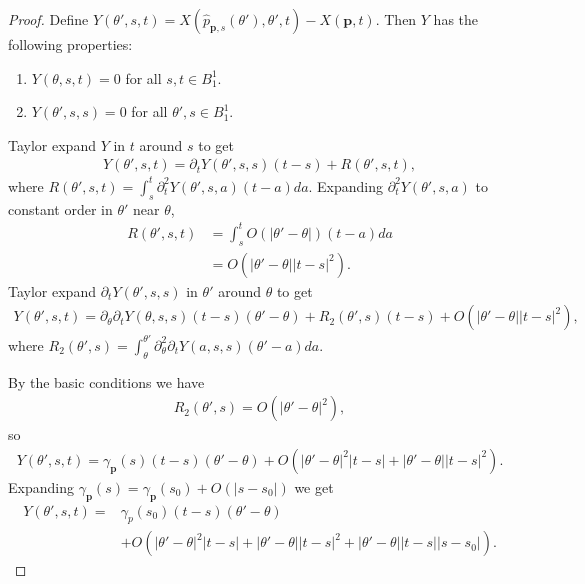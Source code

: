\documentclass[12pt]{amsart}
\numberwithin{equation}{section}
\newcommand{\1}{\mathbbm{1}}
\newcommand{\p}{\mathbf p}
\begin{document}
\begin{proof}
    Define $Y(\theta', s, t) = X(\hat p_{\p,s}(\theta'), \theta', t) - X(\p,t)$. Then $Y$ has the following properties:
    \begin{enumerate}
        \item $Y(\theta, s, t) = 0$ for all $s,t \in B_1^1$. 
        \item $Y(\theta', s, s) = 0$ for all $\theta', s \in B_1^1$. 
    \end{enumerate}
    Taylor expand $Y$ in $t$ around $s$ to get 
    \begin{align}
        Y(\theta', s, t) = \partial_t Y(\theta', s, s)(t - s) + R(\theta', s, t),
    \end{align}
    where $R(\theta', s, t) = \int_{s}^t \partial_t^2 Y(\theta', s, a) (t-a)da$. Expanding $\partial_t^2 Y(\theta',s, a)$ to constant order in $\theta'$ near $\theta$, 
    \begin{align}
        R(\theta', s, t) &=  \int_s^t O(|\theta'-\theta|) (t - a) da\\
        &= O(|\theta' - \theta| |t - s|^2).
    \end{align}
    Taylor expand $\partial_t Y(\theta', s, s)$ in $\theta'$ around $\theta$ to get 
    \begin{align}\label{eq: splice to planey version}
        Y(\theta', s, t) = \partial_\theta \partial_t Y(\theta, s, s) (t - s)(\theta'-\theta) + R_2(\theta', s)(t-s) + O(|\theta' - \theta| |t-s|^2), 
    \end{align}
    where $R_2(\theta', s) =  \int_{\theta}^{\theta'} \partial_\theta^2 \partial_t Y(a, s, s)(\theta' - a) da$. 
   
    By the basic conditions we have 
    \begin{align}
        R_2(\theta', s) = O(|\theta' - \theta|^2),
    \end{align}
    so 
    \begin{align}
        Y(\theta', s, t) = \gamma_\p(s)(t-s)(\theta' - \theta) + O(|\theta' - \theta|^2 |t-s| + |\theta' - \theta| |t - s|^2).
    \end{align} 
    Expanding $\gamma_\p(s) = \gamma_\p(s_0) + O(|s -s_0|)$ we get 
    \begin{align}
        Y(\theta', s, t) =& \gamma_p(s_0) (t - s) (\theta' - \theta) \\&+ O(|\theta' - \theta |^2 |t-s| + |\theta' - \theta| |t - s|^2 + |\theta' - \theta| |t -s| |s - s_0|). \nonumber
    \end{align}
\end{proof}
\end{document}
